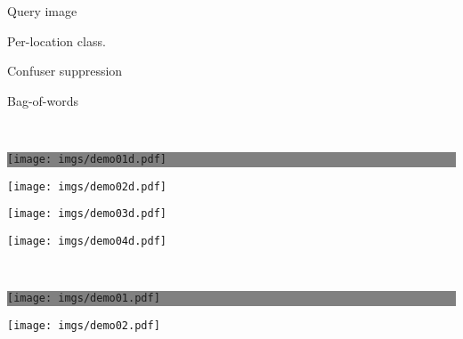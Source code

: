\begin{figure*}[!ht]
	 \begin{minipage}{0.23\linewidth}
		\centering
		Query image
	 \end{minipage}
	 \hspace{3mm}
	 \begin{minipage}{0.23\linewidth}
		\centering
		Per-location class.
	 \end{minipage}
	 \begin{minipage}{0.23\linewidth}
		\centering
		Confuser suppression
	 \end{minipage}
	 \begin{minipage}{0.23\linewidth}
		\centering
		Bag-of-words
	 \end{minipage}
  \\
	 \colorbox{gray}{
		\begin{minipage}{\subw}
		  \centerline{
		  \texttt{[image: imgs/demo01d.pdf]}
		  }
		\end{minipage}
	 }
	 \hspace{3mm}
	 \colorbox{myGreen}{
		\begin{minipage}{\subw}
		  \centerline{
		  \texttt{[image: imgs/demo02d.pdf]}
		  }
		\end{minipage}
	 }
	 \colorbox{myRed}{
		\begin{minipage}{\subw}
		  \centerline{
		  \texttt{[image: imgs/demo03d.pdf]}
		  }
		\end{minipage}
	 }
	 \colorbox{myRed}{
		\begin{minipage}{\subw}
		  \centerline{
		  \texttt{[image: imgs/demo04d.pdf]}
		  }
		\end{minipage}
	 }
	 \vspace{1mm}
	 \\
	 \colorbox{gray}{
		\begin{minipage}{\subw}
		  \centerline{
		  \texttt{[image: imgs/demo01.pdf]}
		  }
		\end{minipage}
	 }
	 \hspace{3mm}
	 \colorbox{myGreen}{
		\begin{minipage}{\subw}
		  \centerline{
		  \texttt{[image: imgs/demo02.pdf]}
		  }
		\end{minipage}
	 }
	 \colorbox{myRed}{
		\begin{minipage}{\subw}

\end{minipage}}
\end{figure*}
